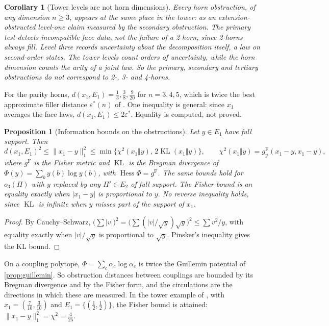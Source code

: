 \documentclass[11pt]{article}
\newtheorem{proposition}[theorem]{Proposition}
\newtheorem{corollary}[theorem]{Corollary}
\theoremstyle{definition}
\theoremstyle{remark}
\begin{document}
\begin{corollary}[Tower levels are not horn dimensions]\label{cor:levels}
Every horn obstruction, of any dimension $n\ge3$, appears at the same place in the tower: as an extension-obstructed
level-one claim measured by the secondary obstruction. The primary test detects incompatible face data, not the failure
of a 2-horn, since 2-horns always fill. Level three records uncertainty about the decomposition itself, a law on second-order states. The tower levels
count orders of uncertainty, while the horn dimension counts the arity of a joint law. So the primary, secondary and
tertiary obstructions do not correspond to 2-, 3- and 4-horns.
\end{corollary}

For the parity horns, $d(x_1,E_1)=\frac13,\frac38,\frac9{20}$ for $n=3,4,5$, which is twice the best approximate filler
distance $\varepsilon^*(n)$ of \cite[\S13.1]{Awasthi-Family}. One inequality is general: since $x_1$ averages the face laws,
$d(x_1,E_1)\le2\varepsilon^*$. Equality is computed, not proved.

\begin{proposition}[Information bounds on the obstructions]\label{prop:infobound}
Let $y\in E_1$ have full support. Then
\[
d(x_1,E_1)^2\le\lVert x_1-y\rVert_1^2\le\min\bigl\{\chi^2(x_1\Vert y),\,2\operatorname{KL}(x_1\Vert y)\bigr\},
\qquad \chi^2(x_1\Vert y)=g^{\mathrm F}_y(x_1-y,x_1-y),
\]
where $g^{\mathrm F}$ is the Fisher metric and $\operatorname{KL}$ is the Bregman divergence of $\Phi(y)=\sum_by(b)\log y(b)$, with
$\operatorname{Hess}\Phi=g^{\mathrm F}$. The same bounds hold for $o_3(\Pi)$ with $y$ replaced by any $\Pi'\in E_2$ of full support.
The Fisher bound is an equality exactly when $\lvert x_1-y\rvert$ is proportional to $y$. No reverse
inequality holds, since $\operatorname{KL}$ is infinite when $y$ misses part of the support of $x_1$.
\end{proposition}
\begin{proof}
By Cauchy--Schwarz, $\bigl(\sum\lvert v\rvert\bigr)^2=\bigl(\sum(\lvert v\rvert/\sqrt y)\sqrt y\bigr)^2\le\sum v^2/y$, with equality
exactly when $\lvert v\rvert/\sqrt y$ is proportional to $\sqrt y$. Pinsker's inequality gives the KL bound.
\end{proof}

On a coupling polytope, $\Phi=\sum_c\alpha_c\log\alpha_c$ is twice the Guillemin potential of \cref{prop:guillemin}. So
obstruction distances between couplings are bounded by its Bregman divergence and by the Fisher form, and the circulations
are the directions in which these are measured. In the tower example of \cite[\S11]{Awasthi-Family}, with $x_1=(\frac7{10},\frac3{10})$
and $E_1=\{(\frac12,\frac12)\}$, the Fisher bound is attained: $\lVert x_1-y\rVert_1^2=\chi^2=\frac4{25}$.
\end{document}
